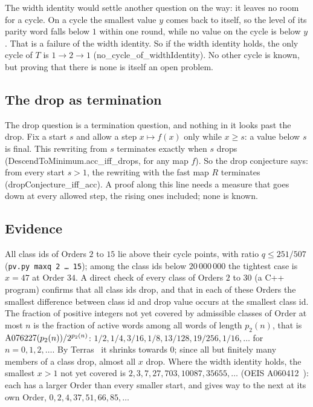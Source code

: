\documentclass[11pt,a4paper,titlepage]{article}
\newcommand{\lean}[1]{\textsf{#1}}
\newcommand{\pv}[1]{\texttt{pv.py #1}}
\begin{document}
\nopagebreak
The width identity would settle another question on the way: it leaves no room
for a cycle. On a cycle the smallest value $y$ comes back to itself, so the level
of its parity word falls below $1$ within one round, while no value on the cycle
is below $y$. That is a failure of the width identity. So if the width
identity holds, the only cycle of $T$ is $1 \to 2 \to 1$
(\lean{no\_cycle\_of\_widthIdentity}). No other cycle is known, but proving that
there is none is itself an open problem.

\subsection*{The drop as termination}

The drop question is a termination question, and nothing in it looks past the
drop. Fix a start $s$ and allow a step $x \mapsto f(x)$ only while $x \ge s$:
a value below $s$ is final. This rewriting from $s$ terminates exactly when $s$
drops (\lean{DescendToMinimum.acc\_iff\_drops}, for any map $f$). So the drop conjecture says:
from every start $s > 1$, the rewriting with the fast map $R$ terminates
(\lean{dropConjecture\_iff\_acc}). A proof along this line needs a measure that
goes down at every allowed step, the rising ones included; none is known.

\subsection*{Evidence}

All class ids of Orders $2$ to $15$ lie above their cycle points, with ratio
$q \le 251/507$ (\pv{maxq 2 \dots\ 15}); among the class ids below $20\,000\,000$ the tightest case is
$x = 47$ at Order $34$.
A direct check of every class of Orders $2$ to $30$ (a C++ program) confirms that all class ids
drop, and that in each of these Orders the smallest difference between class id
and drop value occurs at the smallest class id.
The fraction of positive integers not yet covered by admissible classes of
Order at most $n$ is the fraction of active words among all words of length
$p_2(n)$, that is $\mathrm{A076227}\index{OEIS!A076227}(p_2(n))/2^{p_2(n)}$: $1/2, 1/4, 3/16, 1/8, 13/128,
19/256, 1/16, \dots$ for $n = 0, 1, 2, \dots$. By Terras~\cite{Terras1976} it shrinks towards $0$; since
all but finitely many members of a class drop, almost all $x$ drop. Where the width identity holds, the smallest $x > 1$ not yet covered
is $2, 3, 7, 27, 703, 10087, 35655, \dots$ (OEIS A060412~\cite{OEIS_A060412}): each has a larger Order
than every smaller start, and gives way to the next at its own Order,
$0, 2, 4, 37, 51, 66, 85, \dots$
\end{document}
